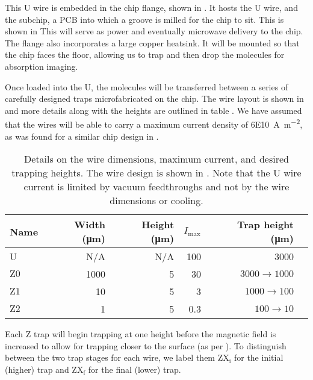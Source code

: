 This U wire is embedded in the chip flange, shown in
. It hosts the U wire, and the subchip, a PCB
into which a groove is milled for the chip to sit. This is shown in
 This will serve as power and
eventually microwave delivery to the chip. The flange also incorporates a large
copper heatsink. It will be mounted so that the chip faces the floor, allowing
us to trap and then drop the molecules for absorption imaging.~\cite{}

\begin{figure}
  \centering
  \caption{}
  \label{design:fig:chipexperiment}
\end{figure}

Once loaded into the U, the molecules will be transferred between a series of
carefully designed traps microfabricated on the chip. The wire layout is shown
in  and more details along with the
heights are outlined in table . We have assumed
that the wires will be able to carry a maximum current density of
\SI{6E10}{\ampere\per\meter\squared}, as was found for a similar chip design in
.

\begin{table}
  \centering
\begin{tabular}{lrrrrr}
  Name & Width (\si{\micro\meter})& Height (\si{\micro\meter})& $I_\text{max}$ & Trap height (\si{\micro\meter}) \\
 \hline
  U & N/A& N/A& 100 & 3000\\
  $\mathrm{Z0}$ & 1000&  5& 30& $3000\rightarrow1000$ \\
  $\mathrm{Z1}$ & 10&  5& 3& $1000\rightarrow100$ \\
  $\mathrm{Z2}$ & 1&  5& 0.3& $100\rightarrow10$ \\
 \hline
\end{tabular}
  \caption{Details on the wire dimensions, maximum current, and desired
  trapping heights. The wire design is shown in
  . Note that the U wire current is
  limited by vacuum feedthroughs and not by the wire dimensions or cooling.
  }
  \label{design:table:wires}
\end{table}

Each Z trap will begin trapping at one height before the magnetic field is
increased to allow for trapping closer to the surface (as per ).
To distinguish between the two trap stages for each wire, we label them
$\mathrm{ZX_i}$ for the initial (higher) trap and $\mathrm{ZX_f}$ for the final
(lower) trap.

